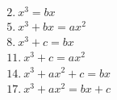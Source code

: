 \documentclass[preview]{standalone}
\begin{document}
\begin{align*}
&2.\ x^3=bx  \\ &5.\ x^3+bx=ax^2 \\ &8.\ x^3+c=bx \\ &11.\ x^3+c=ax^2 \\ &14.\ x^3+ax^2+c=bx \\ &17.\ x^3+ax^2=bx+c
\end{align*}
\end{document}
